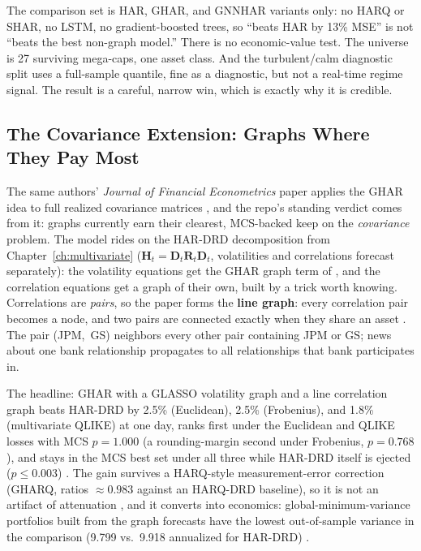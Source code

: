 \begin{warning}
The comparison set is HAR, GHAR, and GNNHAR variants only: no HARQ or SHAR, no LSTM, no gradient-boosted trees, so ``beats HAR by 13\% MSE'' is not ``beats the best non-graph model.'' There is no economic-value test. The universe is 27 surviving mega-caps, one asset class. And the turbulent/calm diagnostic split uses a full-sample quantile, fine as a diagnostic, but not a real-time regime signal. The result is a careful, narrow win, which is exactly why it is credible.
\end{warning}

\subsection{The Covariance Extension: Graphs Where They Pay Most}\label{sec:gnn:ghar-cov}

The same authors' \emph{Journal of Financial Econometrics} paper applies the GHAR idea to full realized covariance matrices \citep{ZhangPuCucuringuDong2024}, and the repo's standing verdict comes from it: graphs currently earn their clearest, MCS-backed keep on the \emph{covariance} problem. The model rides on the HAR-DRD decomposition from Chapter~\ref{ch:multivariate} ($\mathbf{H}_t = \mathbf{D}_t \mathbf{R}_t \mathbf{D}_t$, volatilities and correlations forecast separately): the volatility equations get the GHAR graph term of , and the correlation equations get a graph of their own, built by a trick worth knowing. Correlations are \emph{pairs}, so the paper forms the \textbf{line graph}: every correlation pair becomes a node, and two pairs are connected exactly when they share an asset \citep[Def.~3.3, pp.~8--9]{ZhangPuCucuringuDong2024}. The pair (JPM,~GS) neighbors every other pair containing JPM or GS; news about one bank relationship propagates to all relationships that bank participates in.

The headline: GHAR with a GLASSO volatility graph and a line correlation graph beats HAR-DRD by 2.5\% (Euclidean), 2.5\% (Frobenius), and 1.8\% (multivariate QLIKE) at one day, ranks first under the Euclidean and QLIKE losses with MCS $p = 1.000$ (a rounding-margin second under Frobenius, $p = 0.768$), and stays in the MCS best set under all three while HAR-DRD itself is ejected ($p \le 0.003$) \citep[Table~4, p.~15]{ZhangPuCucuringuDong2024}. The gain survives a HARQ-style measurement-error correction (GHARQ, ratios $\approx 0.983$ against an HARQ-DRD baseline), so it is not an artifact of attenuation \citep[Table~8, p.~24]{ZhangPuCucuringuDong2024}, and it converts into economics: global-minimum-variance portfolios built from the graph forecasts have the lowest out-of-sample variance in the comparison (9.799 vs.\ 9.918 annualized for HAR-DRD) \citep[Table~5, p.~20]{ZhangPuCucuringuDong2024}.

